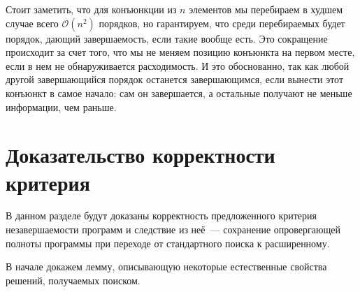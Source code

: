     

    Стоит заметить, что для конъюнкции из $n$ элементов мы перебираем в худшем случае всего $\mathcal{O}(n^2)$ порядков, но гарантируем, что среди перебираемых будет порядок, дающий завершаемость, если такие вообще есть. Это сокращение происходит за счет того, что мы не меняем позицию конъюнкта на первом месте, если в нем не обнаруживается расходимость. И это обоснованно, так как любой другой завершающийся порядок останется завершающимся, если вынести этот конъюнкт в самое начало: сам он завершается, а остальные получают не меньше информации, чем раньше.

  \section{Доказательство корректности критерия}
  
    В данном разделе будут доказаны корректность предложенного критерия незавершаемости программ и следствие из неё~--- сохранение опровергающей полноты программы при переходе от стандартного поиска к расширенному.
    
    В начале докажем лемму, описывающую некоторые естественные свойства решений, получаемых поиском.
    

